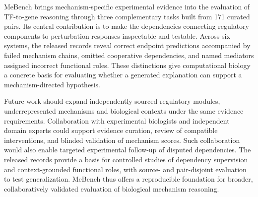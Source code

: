 MeBench brings mechanism-specific experimental evidence into the evaluation of TF-to-gene reasoning through three complementary tasks built from 171 curated pairs. Its central contribution is to make the dependencies connecting regulatory components to perturbation responses inspectable and testable. Across six systems, the released records reveal correct endpoint predictions accompanied by failed mechanism chains, omitted cooperative dependencies, and named mediators assigned incorrect functional roles. These distinctions give computational biology a concrete basis for evaluating whether a generated explanation can support a mechanism-directed hypothesis.

Future work should expand independently sourced regulatory modules, underrepresented mechanisms and biological contexts under the same evidence requirements. Collaboration with experimental biologists and independent domain experts could support evidence curation, review of compatible interventions, and blinded validation of mechanism scores. Such collaboration would also enable targeted experimental follow-up of disputed dependencies. The released records provide a basis for controlled studies of dependency supervision and context-grounded functional roles, with source- and pair-disjoint evaluation to test generalization. MeBench thus offers a reproducible foundation for broader, collaboratively validated evaluation of biological mechanism reasoning.
